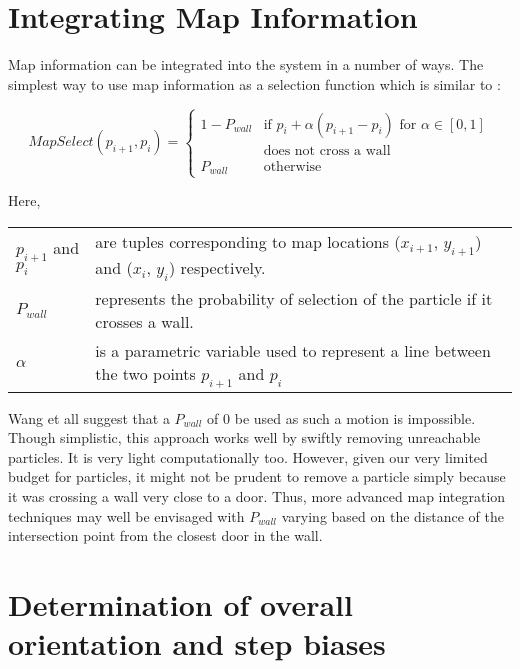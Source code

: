 \section{Integrating Map Information}

Map information can be integrated into the system in a number 
of ways. The simplest way to use map information as a selection 
function which is similar to \cite{Wang}:

\begin{equation}\label{eq:select}
MapSelect(p_{i+1}, p_i) = \begin{cases}1 - P_{wall} & \text{if $p_i + \alpha (p_{i+1} - p_i)$ for $\alpha \in [0,1]$} \\
                                                    & \text{does not cross a wall}\\
                                    P_{wall} & \text{otherwise}
                          \end{cases}
\end{equation}

Here,\\
\begin{tabular}{p{1.5in} p{3.5in}}
$p_{i+1}$ and $p_i$ &   are tuples corresponding to map locations ($x_{i+1}$, $y_{i+1}$) and ($x_i$, $y_i$) respectively. \\
$P_{wall}$ &   represents the probability of selection of the particle if it crosses a wall. \\
$\alpha$ & is a parametric variable used to represent a line between the two points $p_{i+1}$ and $p_i$ \\
\end{tabular}

Wang et all\cite{Wang} suggest that a $P_{wall}$ of 0 be used as such a motion
is impossible. Though simplistic, this approach works well by swiftly removing
unreachable particles. It is very light computationally too. However, given our
very limited budget for particles, it might not be prudent to remove a particle
simply because it was crossing a wall very close to a door. Thus, more advanced
map integration techniques may well be envisaged with $P_{wall}$ varying based
on the distance of the intersection point from the closest door in the wall. 

\section{Determination of overall orientation and step biases\label{sec:overall_bias}}

